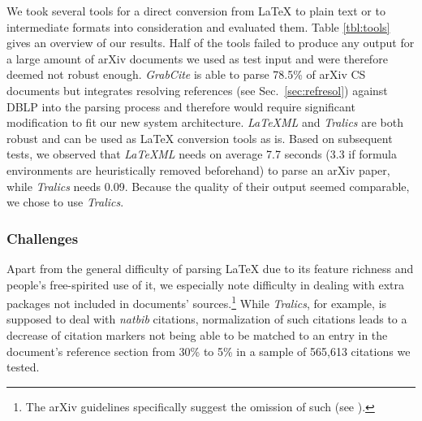 We took several tools for a direct conversion from \LaTeX{} to plain text or to intermediate formats into consideration and evaluated them. Table \ref{tbl:tools} gives an overview of our results. Half of the tools failed to produce any output for a large amount of arXiv documents we used as test input and were therefore deemed not robust enough. \textit{GrabCite} \cite{Faerber2018LREC} is able to parse 78.5\%
of arXiv CS documents but integrates resolving references (see Sec.~\ref{sec:refresol}) against DBLP into the parsing process and therefore would require significant modification to fit our new system architecture. \textit{LaTeXML} and \textit{Tralics} are both robust and can be used as \LaTeX{} conversion tools as is. Based on subsequent tests, we observed that \textit{LaTeXML} needs on average 7.7 seconds (3.3 if formula environments are heuristically removed beforehand) to parse an arXiv paper, while \textit{Tralics} needs 0.09. Because the quality of their output seemed comparable, we chose to use \textit{Tralics}.

\subsubsection{Challenges}\label{sec:refresolchallenges}
Apart from the general difficulty of parsing \LaTeX{} due to its feature richness and people's free-spirited use of it, we especially note difficulty in dealing with extra packages not included in documents' sources.\footnote{The arXiv guidelines specifically suggest the omission of such (see ).} While \textit{Tralics}, for example, is supposed to deal with \textit{natbib} citations, normalization of such citations leads to a decrease of citation markers not being able to be matched to an entry in the document's reference section from 30\% to 5\% in a sample of 565,613 citations we tested.

